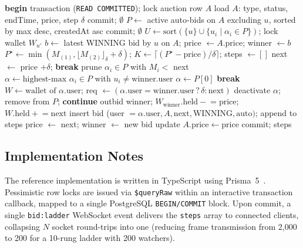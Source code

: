 \documentclass[conference]{IEEEtran}
\begin{document}
\begin{algorithm}[t]
\caption{ResolveAutoBids$(A, u)$}
\label{alg:ladder}
\footnotesize
\begin{algorithmic}[1]
\State \textbf{begin} transaction (\texttt{READ COMMITTED}); lock auction row $A$
\State load $A$: type, status, endTime, price, step $\delta$
  \State commit; \Return $\emptyset$
\EndIf
\State $P \gets$ active auto-bids on $A$ excluding $u$, sorted by max desc, createdAt asc
 \State commit; \Return $\emptyset$ \EndIf
\State $U \gets \text{sort}(\{u\} \cup \{u_i \mid \alpha_i \in P\})$;  lock wallet $W_{u'}$ \EndFor
\State $b \gets$ latest WINNING bid by $u$ on $A$; price $\gets A.\text{price}$; winner $\gets b$
\State $P^\star \gets \min(M_{(1)}, \lfloor M_{(2)} \rfloor_\delta + \delta)$; $K \gets \lceil (P^\star - \text{price})/\delta \rceil$; steps $\gets []$
  \State next $\gets$ price $+ \delta$;  \textbf{break} \EndIf
  \State prune $\alpha_i \in P$ with $M_i <$ next
  \State $\alpha \gets \text{highest-max } \alpha_i \in P \text{ with } u_i \neq \text{winner.user}$
    \State $\alpha \gets P[0]$ 
  \ElsIf{$\alpha = \emptyset$} \textbf{break} \EndIf
  \State $W \gets \text{wallet of } \alpha.\text{user}$; req $\gets (\alpha.\text{user} = \text{winner.user} \mathrel{?} \delta : \text{next})$
    \State deactivate $\alpha$; remove from $P$; \textbf{continue}
  \EndIf
  \State outbid winner; $W_{\text{winner}}.\text{held} \mathrel{-}= \text{price}$; $W.\text{held} \mathrel{+}= \text{next}$
  \State insert bid (user $=\alpha.\text{user}, A, \text{next}, \text{WINNING}, \text{auto})$; append to steps
  \State price $\gets$ next; winner $\gets$ new bid
\EndFor
{} update $A.\text{price} \gets \text{price}$ \EndIf
\State commit; \Return steps
\end{algorithmic}
\end{algorithm}

\subsection{Implementation Notes}
The reference implementation is written in TypeScript using Prisma~5~\cite{Prisma2024}.
Pessimistic row locks are issued via \texttt{\$queryRaw} within an interactive transaction
callback, mapped to a single PostgreSQL \texttt{BEGIN/COMMIT} block. Upon commit, a single
\texttt{bid:ladder} WebSocket event delivers the \texttt{steps} array to connected clients,
collapsing $N$ socket round-trips into one (reducing frame transmission from 2{,}000 to 200
for a 10-rung ladder with 200 watchers).
\end{document}
